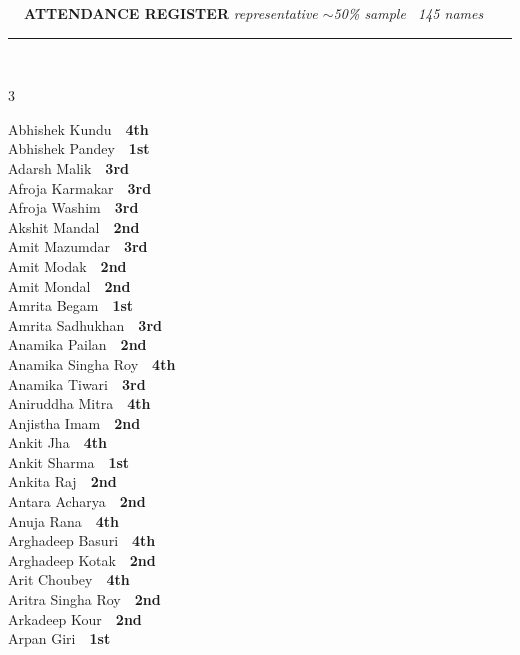\documentclass[11pt,a4paper]{article}
\begin{document}
\vspace{3pt}\noindent
{\footnotesize\bfseries\color{Slate}\faListOl~~ATTENDANCE REGISTER}%
\hfill{\scriptsize\itshape\color{Slate}representative $\sim$50\% sample \textperiodcentered\ 145 names}\\[3pt]
{\color{Line}\rule{\linewidth}{0.5pt}}\\[5pt]
\begingroup\footnotesize\setlength{\columnsep}{20pt}\setlength{\parskip}{1pt}%
\begin{multicols}{3}\raggedright
Abhishek Kundu~\dotfill~\textbf{4th}\\
Abhishek Pandey~\dotfill~\textbf{1st}\\
Adarsh Malik~\dotfill~\textbf{3rd}\\
Afroja Karmakar~\dotfill~\textbf{3rd}\\
Afroja Washim~\dotfill~\textbf{3rd}\\
Akshit Mandal~\dotfill~\textbf{2nd}\\
Amit Mazumdar~\dotfill~\textbf{3rd}\\
Amit Modak~\dotfill~\textbf{2nd}\\
Amit Mondal~\dotfill~\textbf{2nd}\\
Amrita Begam~\dotfill~\textbf{1st}\\
Amrita Sadhukhan~\dotfill~\textbf{3rd}\\
Anamika Pailan~\dotfill~\textbf{2nd}\\
Anamika Singha Roy~\dotfill~\textbf{4th}\\
Anamika Tiwari~\dotfill~\textbf{3rd}\\
Aniruddha Mitra~\dotfill~\textbf{4th}\\
Anjistha Imam~\dotfill~\textbf{2nd}\\
Ankit Jha~\dotfill~\textbf{4th}\\
Ankit Sharma~\dotfill~\textbf{1st}\\
Ankita Raj~\dotfill~\textbf{2nd}\\
Antara Acharya~\dotfill~\textbf{2nd}\\
Anuja Rana~\dotfill~\textbf{4th}\\
Arghadeep Basuri~\dotfill~\textbf{4th}\\
Arghadeep Kotak~\dotfill~\textbf{2nd}\\
Arit Choubey~\dotfill~\textbf{4th}\\
Aritra Singha Roy~\dotfill~\textbf{2nd}\\
Arkadeep Kour~\dotfill~\textbf{2nd}\\
Arpan Giri~\dotfill~\textbf{1st}\\

\end{multicols}
\end{document}
